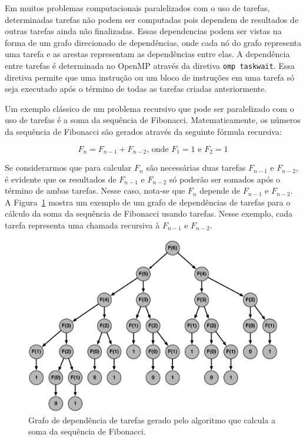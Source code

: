 \documentclass{SBCbookchapter}
\begin{document}
	Em muitos problemas computacionais paralelizados com o uso de tarefas, determinadas tarefas não podem
	ser computadas pois dependem de resultados de outras tarefas ainda não finalizadas. Essas dependencias
	podem ser vistas na forma de um grafo direcionado de dependências, onde cada nó do grafo representa
	uma tarefa e as arestas representam as dependências entre elas. A dependência entre tarefas é determinada
	no OpenMP através da diretiva \texttt{omp taskwait}. Essa diretiva permite que uma instrução ou um bloco de
	instruções em uma tarefa só seja executado após o término de todas as tarefas criadas anteriormente.
	
	Um exemplo clássico de um problema recursivo que pode ser paralelizado com o uso de tarefas é a soma da
	sequência de Fibonacci. Matematicamente, os números da sequência de Fibonacci são gerados através da
	seguinte fórmula recursiva:
	
	\begin{equation}
		F_n = F_{n-1} + F_{n-2} \text{, onde } F_1=1 \text{ e } F_2=1
	\end{equation}

	Se considerarmos que para calcular $F_n$ são necessárias duas tarefas $F_{n-1}$ e $F_{n-2}$, é evidente que
	os resultados de $F_{n-1}$ e $F_{n-2}$ só poderão ser somados após o término de ambas tarefas. Nesse caso,
	nota-se que $F_n$ depende de $F_{n-1}$ e $F_{n-2}$. A Figura~\ref{fig:fibonacci} mostra um exemplo de um
	grafo de dependências de tarefas para o cálculo da soma da sequência de Fibonacci usando tarefas. Nesse
	exemplo, cada tarefa representa uma chamada recursiva à $F_{n-1}$ e $F_{n-2}$.

		\begin{figure}[t]
			\centering
			\includegraphics[width=0.8\linewidth]{img/fibonacci}
			\caption{Grafo de dependência de tarefas gerado pelo algoritmo que calcula a soma da sequência
			de Fibonacci.}\label{fig:fibonacci}
		\end{figure}
\end{document}
